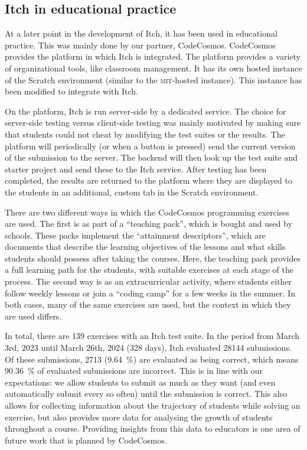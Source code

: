 \documentclass[../main]{subfiles}
\begin{document}
\subsection{Itch in educational practice}\label{subsec:itch-in-educational-practice}

At a later point in the development of Itch, it has been used in educational practice.
This was mainly done by our partner, CodeCosmos.
CodeCosmos provides the platform in which Itch is integrated.
The platform provides a variety of organizational tools, like classroom management.
It has its own hosted instance of the Scratch environment (similar to the \textsc{mit}-hosted instance).
This instance has been modified to integrate with Itch.

On the platform, Itch is run server-side by a dedicated service.
The choice for server-side testing versus client-side testing was mainly motivated by making sure that students could not cheat by modifying the test suites or the results.
The platform will periodically (or when a button is pressed) send the current version of the submission to the server.
The backend will then look up the test suite and starter project and send these to the Itch service.
After testing has been completed, the results are returned to the platform where they are displayed to the students in an additional, custom tab in the Scratch environment.

There are two different ways in which the CodeCosmos programming exercises are used.
The first is as part of a ``teaching pack'', which is bought and used by schools.
These packs implement the ``attainment descriptors'', which are documents that describe the learning objectives of the lessons and what skills students should possess after taking the courses.
Here, the teaching pack provides a full learning path for the students, with suitable exercises at each stage of the process.
The second way is as an extracurricular activity, where students either follow weekly lessons or join a ``coding camp'' for a few weeks in the summer.
In both cases, many of the same exercises are used, but the context in which they are used differs.

In total, there are 139 exercises with an Itch test suite.
In the period from March 3rd, 2023 until March 26th, 2024 (328 days), Itch evaluated \num{28144} submissions.
Of these submissions, \num{2713} (\qty{9.64}{\percent}) are evaluated as being correct, which means \qty{90.36}{\percent} of evaluated submissions are incorrect.
This is in line with our expectations: we allow students to submit as much as they want (and even automatically submit every so often) until the submission is correct.
This also allows for collecting information about the trajectory of students while solving an exercise, but also provides more data for analysing the growth of students throughout a course.
Providing insights from this data to educators is one area of future work that is planned by CodeCosmos.
\end{document}
